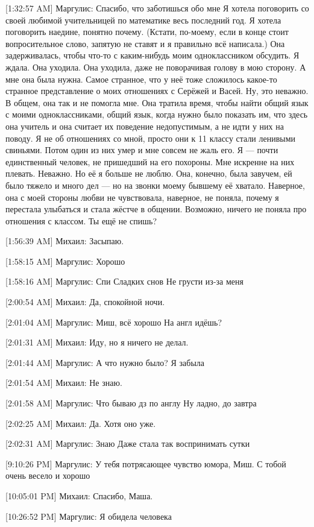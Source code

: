 \documentclass{article}
\begin{document}
[1:32:57 AM] Маргулис:
Спасибо, что заботишься обо мне
 Я хотела поговорить со своей любимой учительницей по математике весь последний год. Я хотела поговорить наедине, понятно почему. (Кстати, по-моему, если в конце стоит вопросительное слово, запятую не ставят и я правильно всё написала.) Она задерживалась, чтобы что-то с каким-нибудь моим одноклассником обсудить. Я ждала. Она уходила. Она уходила, даже не поворачивая голову в мою сторону. А мне она была нужна. Самое странное, что у неё тоже сложилось какое-то странное представление о моих отношениях с Серёжей и Васей. Ну, это неважно. В общем, она так и не помогла мне. Она тратила время, чтобы найти общий язык с моими одноклассниками, общий язык, когда нужно было показать им, что здесь она учитель и она считает их поведение недопустимым, а не идти у них на поводу. Я не об отношениях со мной, просто они к 11 классу стали ленивыми свиньями. Потом один из них умер и мне совсем не жаль его. Я — почти единственный человек, не пришедший на его похороны. Мне искренне на них плевать. Неважно. Но её я больше не люблю. Она, конечно, была завучем, ей было тяжело и много дел — но на звонки моему бывшему её хватало.
 Наверное, она с моей стороны любви не чувствовала, наверное, не поняла, почему я перестала улыбаться и стала жёстче в общении. Возможно, ничего не поняла про отношения с классом.
 Ты ещё не спишь?

[1:56:39 AM] Михаил:
Засыпаю.

[1:58:15 AM] Маргулис:
Хорошо

[1:58:16 AM] Маргулис:
Спи
 Сладких снов
 Не грусти из-за меня

[2:00:54 AM] Михаил:
Да, спокойной ночи.

[2:01:04 AM] Маргулис:
Миш, всё хорошо
 На англ идёшь?

[2:01:31 AM] Михаил:
Иду, но я ничего не делал.

[2:01:44 AM] Маргулис:
А что нужно было?
 Я забыла

[2:01:54 AM] Михаил:
Не знаю.

[2:01:58 AM] Маргулис:
Что бываю дз по англу
 Ну ладно, до завтра

[2:02:25 AM] Михаил:
Да. Хотя оно уже.

[2:02:31 AM] Маргулис:
Знаю
 Даже стала так воспринимать сутки

[9:10:26 PM] Маргулис:
У тебя потрясающее чувство юмора, Миш. С тобой очень весело и хорошо

[10:05:01 PM] Михаил:
Спасибо, Маша.

[10:26:52 PM] Маргулис:
Я обидела человека
\end{document}
